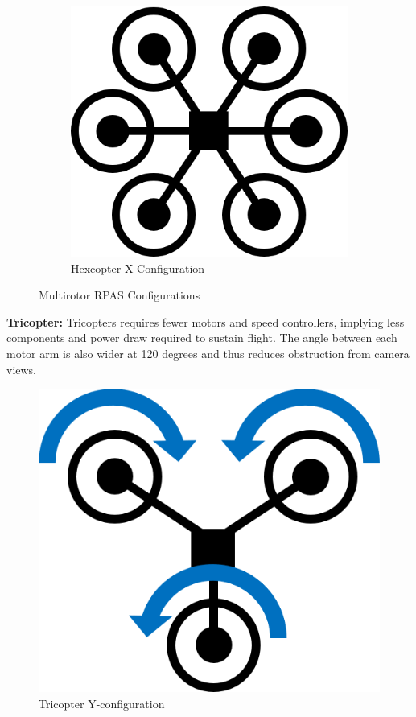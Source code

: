 \begin{figure}[b]
\begin{subfigure}[b]{0.3\textwidth}
        \includegraphics[scale=0.4]{img/drone_hexconfig}
        \caption{Hexcopter X-Configuration}
        \label{fig:hexcopter-x}
    \end{subfigure}
    
    \caption{Multirotor RPAS Configurations}
    \label{fig:rpas-config}
\end{figure}

\textbf{Tricopter:} Tricopters requires fewer motors and speed controllers, implying less components and power draw required to sustain flight. The angle between each motor arm is also wider at 120 degrees and thus reduces obstruction from camera views. 

\begin{figure}[h]
    \centering
    \includegraphics[scale=0.4]{img/drone_yconfigt}
    \caption{Tricopter Y-configuration}
    \label{fig:tricopter-y-t}
\end{figure}

